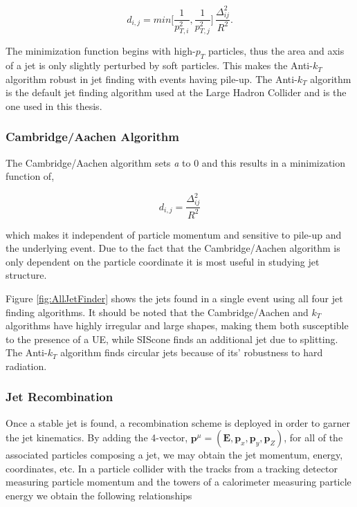 \begin{equation}
d_{i,j} = min \Bigg [\frac{1}{p^{2}_{T,i}}, \frac{1}{p^{2}_{T,j}} \Bigg ] \, \frac{\Delta^{2}_{ij}}{R^{2}}.
\label{eq:Akt}
\end{equation}

The minimization function begins with high-$p_{T}$ particles, thus the area and axis of a jet is only slightly perturbed by soft particles.  This makes the Anti-$k_{T}$ algorithm robust in jet finding with events having pile-up.  The Anti-$k_{T}$ algorithm is the default jet finding algorithm used at the Large Hadron Collider and is the one used in this thesis.

\subsubsection{Cambridge/Aachen Algorithm}

The Cambridge/Aachen algorithm sets \textit{a} to 0 and this results in a minimization function of,

\begin{equation}
d_{i,j} = \frac{\Delta^{2}_{ij}}{R^{2}}
\label{eq:CBalg}
\end{equation}

\noindent
which makes it independent of particle momentum and sensitive to pile-up and the underlying event.  Due to the fact that the Cambridge/Aachen algorithm is only dependent on the particle coordinate it is most useful in studying jet structure.

Figure \ref{fig:AllJetFinder} shows the jets found in a single event using all four jet finding algorithms.  It should be noted that the Cambridge/Aachen and $k_{T}$ algorithms have highly irregular and large shapes, making them both susceptible to the presence of a UE, while SIScone finds an additional jet due to splitting.  The Anti-$k_{T}$ algorithm finds circular jets because of its' robustness to hard radiation.  


\subsubsection{Jet Recombination}
Once a stable jet is found, a recombination scheme is deployed in order to garner the jet kinematics.  By adding the 4-vector, $\boldsymbol{p}^{\mu} = (\boldsymbol{E},\boldsymbol{p}_{x},\boldsymbol{p}_{y},\boldsymbol{p}_{Z})$, for all of the associated particles composing a jet, we may obtain the jet momentum, energy, coordinates, etc.  In a particle collider with the tracks from a tracking detector measuring particle momentum and the towers of a calorimeter measuring particle energy we obtain the following relationships



